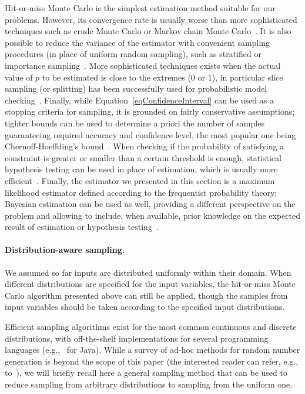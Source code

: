 Hit-or-miss Monte Carlo is the simplest estimation method suitable for our problems. However, its convergence rate is usually worse than more sophisticated techniques such as crude Monte Carlo or Markov chain Monte Carlo~\cite{Robert2005MCBook}. It is also possible to reduce the variance of the estimator with convenient sampling procedures (in place of uniform random sampling), such as stratified or importance sampling~\cite{Robert2005MCBook}. More sophisticated techniques exists when the actual value of $p$ to be estimated is close to the extremes (0 or 1), in particular slice sampling (or splitting) has been successfully used for probabilistic model checking~\cite{importanceSamplingSMC,splittingSMC,statisticalModelChecking}. Finally, while Equation~\eqref{eqConfidenceInterval} can be used as a stopping criteria for sampling, it is grounded on fairly conservative assumptions; tighter bounds can be used to determine a priori the number of samples guaranteeing required accuracy and confidence level, the most popular one being Chernoff-Hoeffding's bound~\cite{hoeffding1963probability,approximatePMC,statisticalModelChecking}. When checking if the probability of satisfying a constraint is greater or smaller than a certain threshold is enough, statistical hypothesis testing can be used in place of estimation, which is usually more efficient~\cite{pestman1998mathematical}. Finally, the estimator we presented in this section is a maximum likelihood estimator defined according to the frequentist probability theory; Bayesian estimation can be used as well, providing a different perspective on the problem and allowing to include, when available, prior knowledge on the expected result of estimation or hypothesis testing~\cite{Robert2007BayesianChoice,gelman2003bayesian}.



\paragraph{Distribution-aware sampling.} We assumed so far inputs are distributed uniformly within their domain. When different distributions are specified for the input variables, the hit-or-miss Monte Carlo algorithm presented above can still be applied, though the samples from input variables should be taken according to the specified input distributions.

Efficient sampling algorithms exist for the most common continuous and discrete distributions, with off-the-shelf implementations for several programming languages (e.g.,~\cite{commonsMath3} for Java). While a survey of ad-hoc methods for random number generation is beyond the scope of this paper (the interested reader can refer, e.g., to~\cite{gentle2013random}), we will briefly recall here a general sampling method that can be used to reduce sampling from arbitrary distributions to sampling from the uniform one. 

